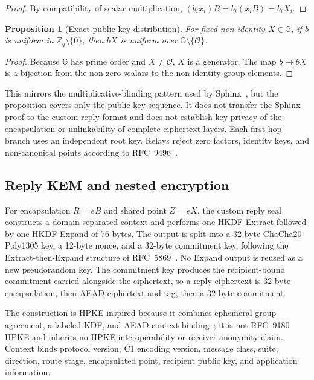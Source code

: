 \documentclass[11pt,oneside]{article}
\newcommand{\Zq}{\mathbb{Z}_q}
\newcommand{\Group}{\mathbb{G}}
\newcommand{\Identity}{\mathcal{O}}
\newtheorem{proposition}{Proposition}
\begin{document}
\begin{proof}
By compatibility of scalar multiplication,
$(b_ix_i)B=b_i(x_iB)=b_iX_i$.
\end{proof}

\begin{proposition}[Exact public-key distribution]
For fixed non-identity $X\in\Group$, if $b$ is uniform in $\Zq\setminus\{0\}$, then $bX$ is uniform over $\Group\setminus\{\Identity\}$.
\end{proposition}

\begin{proof}
Because $\Group$ has prime order and $X\ne\Identity$, $X$ is a generator. The map $b\mapsto bX$ is a bijection from the non-zero scalars to the non-identity group elements.
\end{proof}

This mirrors the multiplicative-blinding pattern used by Sphinx~\cite{sphinx}, but the proposition covers only the public-key sequence. It does not transfer the Sphinx proof to the custom reply format and does not establish key privacy of the encapsulation or unlinkability of complete ciphertext layers. Each first-hop branch uses an independent root key. Relays reject zero factors, identity keys, and non-canonical points according to RFC~9496~\cite{ristretto}.

\subsection{Reply KEM and nested encryption}

For encapsulation $R=eB$ and shared point $Z=eX$, the custom reply seal constructs a domain-separated context and performs one HKDF-Extract followed by one HKDF-Expand of 76 bytes. The output is split into a 32-byte ChaCha20-Poly1305 key, a 12-byte nonce, and a 32-byte commitment key, following the Extract-then-Expand structure of RFC~5869~\cite{hkdf}. No Expand output is reused as a new pseudorandom key. The commitment key produces the recipient-bound commitment carried alongside the ciphertext, so a reply ciphertext is $32$-byte encapsulation, then AEAD ciphertext and tag, then a $32$-byte commitment.

The construction is HPKE-inspired because it combines ephemeral group agreement, a labeled KDF, and AEAD context binding~\cite{hpke,chacha}; it is not RFC~9180 HPKE and inherits no HPKE interoperability or receiver-anonymity claim. Context binds protocol version, C1 encoding version, message class, suite, direction, route stage, encapsulated point, recipient public key, and application information.
\end{document}
